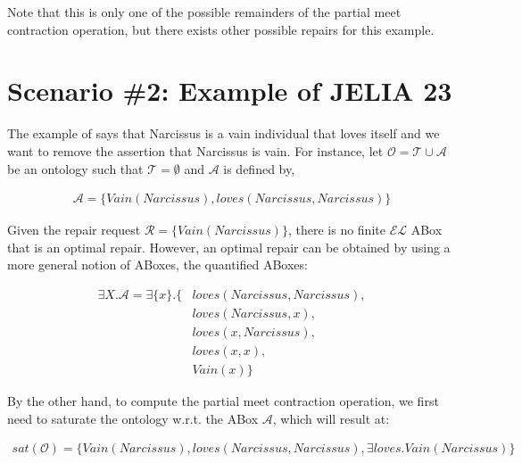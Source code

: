 Note that this is only one of the possible remainders of the partial meet contraction operation, but there exists other possible repairs for this example.

\section{Scenario \#2: Example of JELIA 23}
\label{sec:scenario-2}
The example of \citep{Baader-JELIA23} says that Narcissus is a vain individual that loves itself and we want to remove the assertion that Narcissus is vain. For instance, let $\mathcal{O} = \mathcal{T} \cup \mathcal{A}$ be an ontology such that $\mathcal{T} = \emptyset$ and $\mathcal{A}$ is defined by,

\begin{equation*}
    \begin{aligned}
        \mathcal{A} = \{ Vain(Narcissus), loves(Narcissus, Narcissus) \}
    \end{aligned}
\end{equation*}

Given the repair request $\mathcal{R} = \{ Vain(Narcissus) \}$, there is no finite $\mathcal{EL}$ ABox that is an optimal repair. However, an optimal repair can be obtained by using a more general notion of ABoxes, the quantified ABoxes:

\begin{equation*}
    \begin{aligned}
        \exists X.\mathcal{A} = \exists \{ x \}.\{ & loves(Narcissus, Narcissus),  \\
                                                   & loves(Narcissus, x),          \\
                                                   & loves(x, Narcissus),          \\
                                                   & loves(x, x),                  \\ 
                                                   & Vain(x) \}
    \end{aligned}
\end{equation*}

By the other hand, to compute the partial meet contraction operation, we first need to saturate the ontology w.r.t. the ABox $\mathcal{A}$, which will result at:

\begin{equation*}
    \begin{aligned}
        sat(\mathcal{O}) = \{ Vain(Narcissus), loves(Narcissus, Narcissus), \exists loves.Vain(Narcissus) \}
    \end{aligned}
\end{equation*}

